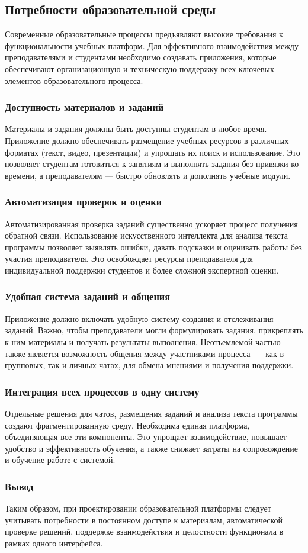 \subsection{Потребности образовательной среды}

Современные образовательные процессы предъявляют высокие требования к функциональности учебных платформ. Для эффективного взаимодействия между преподавателями и студентами необходимо создавать приложения, которые обеспечивают организационную и техническую поддержку всех ключевых элементов образовательного процесса.

\subsubsection{Доступность материалов и заданий}
Материалы и задания должны быть доступны студентам в любое время. Приложение должно обеспечивать размещение учебных ресурсов в различных форматах (текст, видео, презентации) и упрощать их поиск и использование. Это позволяет студентам готовиться к занятиям и выполнять задания без привязки ко времени, а преподавателям — быстро обновлять и дополнять учебные модули.

\subsubsection{Автоматизация проверок и оценки}
Автоматизированная проверка заданий существенно ускоряет процесс получения обратной связи. Использование искусственного интеллекта для анализа текста программы позволяет выявлять ошибки, давать подсказки и оценивать работы без участия преподавателя. Это освобождает ресурсы преподавателя для индивидуальной поддержки студентов и более сложной экспертной оценки.

\subsubsection{Удобная система заданий и общения}
Приложение должно включать удобную систему создания и отслеживания заданий. Важно, чтобы преподаватели могли формулировать задания, прикреплять к ним материалы и получать результаты выполнения. Неотъемлемой частью также является возможность общения между участниками процесса~--- как в групповых, так и личных чатах, для обмена мнениями и получения поддержки.

\subsubsection{Интеграция всех процессов в одну систему}
Отдельные решения для чатов, размещения заданий и анализа текста программы создают фрагментированную среду. Необходима единая платформа, объединяющая все эти компоненты. Это упрощает взаимодействие, повышает удобство и эффективность обучения, а также снижает затраты на сопровождение и обучение работе с системой.

\subsubsection{Вывод}

Таким образом, при проектировании образовательной платформы следует учитывать потребности в постоянном доступе к материалам, автоматической проверке решений, поддержке взаимодействия и целостности функционала в рамках одного интерфейса.
